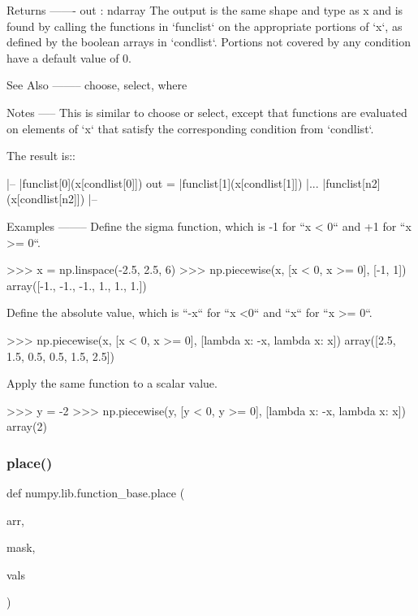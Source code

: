 \begin{DoxyVerb}
Returns
-------
out : ndarray
    The output is the same shape and type as x and is found by
    calling the functions in `funclist` on the appropriate portions of `x`,
    as defined by the boolean arrays in `condlist`.  Portions not covered
    by any condition have a default value of 0.


See Also
--------
choose, select, where

Notes
-----
This is similar to choose or select, except that functions are
evaluated on elements of `x` that satisfy the corresponding condition from
`condlist`.

The result is::

        |--
        |funclist[0](x[condlist[0]])
  out = |funclist[1](x[condlist[1]])
        |...
        |funclist[n2](x[condlist[n2]])
        |--

Examples
--------
Define the sigma function, which is -1 for ``x < 0`` and +1 for ``x >= 0``.

>>> x = np.linspace(-2.5, 2.5, 6)
>>> np.piecewise(x, [x < 0, x >= 0], [-1, 1])
array([-1., -1., -1.,  1.,  1.,  1.])

Define the absolute value, which is ``-x`` for ``x <0`` and ``x`` for
``x >= 0``.

>>> np.piecewise(x, [x < 0, x >= 0], [lambda x: -x, lambda x: x])
array([2.5,  1.5,  0.5,  0.5,  1.5,  2.5])

Apply the same function to a scalar value.

>>> y = -2
>>> np.piecewise(y, [y < 0, y >= 0], [lambda x: -x, lambda x: x])
array(2)\end{DoxyVerb}
 \mbox{\label{namespacenumpy_1_1lib_1_1function__base_a364dd8b8908a04189e7fa1383a20d7a3}} 
\subsubsection{\texorpdfstring{place()}{place()}}
{\footnotesize\ttfamily def numpy.\+lib.\+function\+\_\+base.\+place (\begin{DoxyParamCaption}\item[{}]{arr,  }\item[{}]{mask,  }\item[{}]{vals }\end{DoxyParamCaption})}

